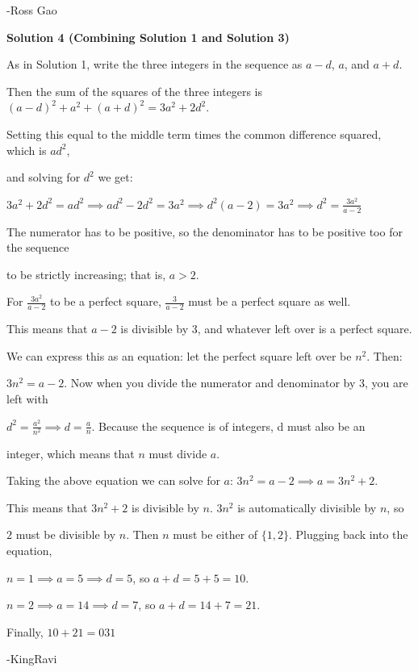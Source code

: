 \begin{enumerate}
 -Ross Gao

 



\textbf{Solution 4 (Combining Solution 1 and Solution 3)}

As in Solution 1, write the three integers in the sequence as $a-d$, $a$, and $a+d$.

 Then the sum of the squares of the three integers is $(a-d)^2+a^2+(a+d)^2 = 3a^2+2d^2$.

 Setting this equal to the middle term times the common difference squared, which is $ad^2$, 

 and solving for $d^2$ we get:

 $3a^2+2d^2 = ad^2 \implies ad^2-2d^2 = 3a^2 \implies d^2(a-2) = 3a^2 \implies d^2 = \frac{3a^2}{a-2}$

 The numerator has to be positive, so the denominator has to be positive too for the sequence 

 to be strictly increasing; that is, $a>2$. 

 For $\frac{3a^2}{a-2}$ to be a perfect square, $\frac{3}{a-2}$ must be a perfect square as well.

 This means that $a-2$ is divisible by 3, and whatever left over is a perfect square.

 We can express this as an equation: let the perfect square left over be $n^2$. Then:

 $3n^2 = a-2$. Now when you divide the numerator and denominator by 3, you are left with

 $d^2 = \frac{a^2}{n^2} \implies d = \frac{a}{n}$. Because the sequence is of integers, d must also be an 

 integer, which means that $n$ must divide $a$. 

 Taking the above equation we can solve for $a$: $3n^2 = a-2 \implies a = 3n^2+2$. 

 This means that $3n^2+2$ is divisible by $n$. $3n^2$ is automatically divisible by $n$, so 

 $2$ must be divisible by $n$. Then $n$ must be either of $\{1,2\}$. Plugging back into the equation, 

 $n = 1 \implies a = 5 \implies d = 5$, so $a+d = 5+5 = 10$.

 $n = 2 \implies a = 14 \implies d = 7$, so $a+d = 14+7 = 21$.

 Finally, $10+21 = \boxed{031}$

 -KingRavi

 




\end{enumerate}
